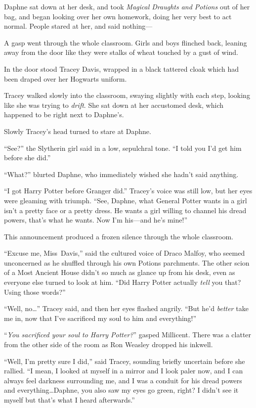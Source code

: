 Daphne sat down at her desk, and took \emph{Magical Draughts and Potions} out of her bag, and began looking over her own homework, doing her very best to act normal. People stared at her, and said nothing—

A gasp went through the whole classroom. Girls and boys flinched back, leaning away from the door like they were stalks of wheat touched by a gust of wind.

In the door stood Tracey Davis, wrapped in a black tattered cloak which had been draped over her Hogwarts uniform.

Tracey walked slowly into the classroom, swaying slightly with each step, looking like she was trying to \emph{drift}. She sat down at her accustomed desk, which happened to be right next to Daphne’s.

Slowly Tracey’s head turned to stare at Daphne.

“See?” the Slytherin girl said in a low, sepulchral tone. “I told you I’d get him before she did.”

“What?” blurted Daphne, who immediately wished she hadn’t said anything.

“I got Harry Potter before Granger did.” Tracey’s voice was still low, but her eyes were gleaming with triumph. “See, Daphne, what General Potter wants in a girl isn’t a pretty face or a pretty dress. He wants a girl willing to channel his dread powers, that’s what he wants. Now I’m his—and he’s mine!”

This announcement produced a frozen silence through the whole classroom.

“Excuse me, Miss~Davis,” said the cultured voice of Draco Malfoy, who seemed unconcerned as he shuffled through his own Potions parchments. The other scion of a Most Ancient House didn’t so much as glance up from his desk, even as everyone else turned to look at him. “Did Harry Potter actually \emph{tell} you that? Using those words?”

“Well, no…” Tracey said, and then her eyes flashed angrily. “But he’d \emph{better} take me in, now that I’ve sacrificed my soul to him and everything!”

“\emph{You sacrificed your soul to Harry Potter?}” gasped Millicent. There was a clatter from the other side of the room as Ron Weasley dropped his inkwell.

“Well, I’m pretty sure I did,” said Tracey, sounding briefly uncertain before she rallied. “I mean, I looked at myself in a mirror and I look paler now, and I can always feel darkness surrounding me, and I was a conduit for his dread powers and everything…Daphne, you also saw my eyes go green, right? I didn’t see it myself but that’s what I heard afterwards.”

